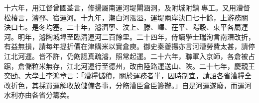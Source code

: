 \begin{pinyinscope}
十六年，用江督曾國荃言，修揚屬南運河堤閘涵洞，及附城附鎮專工。又用漕督松椿言，濬邳、宿運河。十九年，潮白河漲溢，運堤兩岸決口七十餘，上游務關決口七。是冬均塞。二十年，濬濟寧、汶上、滕、嶧、茌平、陽穀、東平各屬運河。明年，濬陶城埠至臨清運河二百餘里。二十四年，侍讀學士瑞洵言南漕改折，有益無損，請每年提折價在津購米以實倉庾。御史秦夔揚亦言河漕勞費太甚，請停江北河運。皆不許，仍飭認真疏濬，照常起運。二十六年，聯軍入京師，各倉被占踞，倉儲粒米無存，江北河運行至德州，改由陸路運送山、陜。二十七年，慶親王奕劻、大學士李鴻章言：「漕糧儲積，關於運務者半，因時制宜，請詔各省漕糧全改折色，其採買運解收放儲備各事，分飭漕臣倉臣籌辦。」自是河運遂廢，而運河水利亦由各省分籌矣。


\end{pinyinscope}